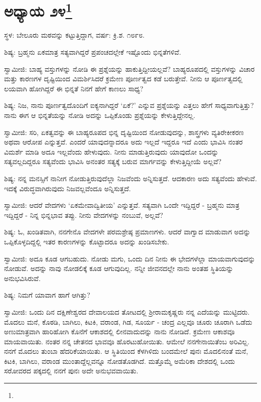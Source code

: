 \chapter[ಅಧ್ಯಾಯ ೨೪]{ಅಧ್ಯಾಯ ೨೪\protect\footnote{}}

\centerline{ಸ್ಥಳ: ಬೇಲೂರು ಮಠವನ್ನು ಕಟ್ಟುತ್ತಿದ್ದಾಗ, ವರ್ಷ: ಕ್ರಿ.ಶ. ೧೮೯೮.}

ಶಿಷ್ಯ: ಬ್ರಹ್ಮನು ಏಕಮಾತ್ರ ಸತ್ಯವಾಗಿದ್ದರೆ ಪ್ರಪಂಚದಲ್ಲೇಕೆ ಇಷ್ಟೊಂದು ಭಿನ್ನತೆಗಳಿವೆ.

ಸ್ವಾಮೀಜಿ: ಬಾಹ್ಯ ವಸ್ತುಗಳನ್ನು ನೋಡಿ ಈ ಪ್ರಶ್ನೆಯನ್ನು ಹಾಕುತ್ತಿದ್ದೀಯಲ್ಲವೆ? ಬಾಹ್ಯರೂಪದಲ್ಲಿ ವಸ್ತುಗಳನ್ನು ವಿಚಾರ ಮತ್ತು ಕಾರಣಗಳ ದೃಷ್ಟಿಯಿಂದ ವಿಮರ್ಶಿಸಿದರೆ ಕ್ರಮೇಣ ಪೂರ್ಣತ್ವದ ಕಡೆ ಬರುತ್ತೇವೆ. ನೀನು ಆ ಪೂರ್ಣತ್ವದಲ್ಲಿ ಲಯವಾಗಿ ಹೋಗಿದ್ದರೆ ಈ ಭಿನ್ನತೆ ನಿನಗೆ ಹೇಗೆ ಕಾಣಲು ಸಾಧ್ಯ?

ಶಿಷ್ಯ: ನಿಜ, ನಾನು ಪೂರ್ಣತ್ವದೊಂದಿಗೆ ಐಕ್ಯನಾಗಿದ್ದರೆ ‘ಏಕೆ?’ ಎನ್ನುವ ಪ್ರಶ್ನೆಯನ್ನು ಎತ್ತಲು ಹೇಗೆ ಸಾಧ್ಯವಾಗುತ್ತಿತ್ತು? ನಾನು ಈಗ ಆ ಭಿನ್ನತೆಯನ್ನು ನೋಡಿ ಅದನ್ನು ಒಪ್ಪಿಕೊಂಡು ಪ್ರಶ್ನೆಯನ್ನು ಕೇಳುತ್ತಿದ್ದೇನಲ್ಲ.

ಸ್ವಾಮೀಜಿ: ಸರಿ, ಏಕತ್ವವನ್ನು ಈ ಬಾಹ್ಯರೂಪದ ಭಿನ್ನ ದೃಷ್ಟಿಯಿಂದ ನೋಡುವುದನ್ನು, ಶಾಸ್ತ್ರಗಳು ವ್ಯತಿರೇಕೀಕರಣ ಅಥವಾ ಆರೋಪ ಎನ್ನುತ್ತವೆ. ಎಂದರೆ ಯಾವುದನ್ನಾದರೂ ಅದು ಇಲ್ಲದೆ ಇದ್ದರೂ ಇದೆ ಎಂದು ಭಾವಿಸಿ ನಂತರ ವಿಮರ್ಶೆ ಮಾಡಿ ಅದೂ ಇಲ್ಲವೆಂದು ಹೇಳುವುದು. ನೀನು ಮಾಡುತ್ತಿರುವುದು ಯಾವುದೋ ಒಂದನ್ನು ಸತ್ಯವಲ್ಲದಿದ್ದರೂ ಸತ್ಯವೆಂದು ಭಾವಿಸಿ ಅನಂತರ ಸತ್ಯಕ್ಕೆ ಬರುವ ಮಾರ್ಗವನ್ನು ಕೇಳುತ್ತಿದ್ದೀಯೆ ಅಲ್ಲವೆ?

ಶಿಷ್ಯ: ನನ್ನ ಮನಸ್ಸಿಗೆ ನಾನೀಗ ನೋಡುತ್ತಿರುವುದೆಲ್ಲಾ ನಿಜವೆಂದು ಅನ್ನಿಸುತ್ತದೆ. ಆದಕಾರಣ ಅದು ಸತ್ಯವೆಂದು ಹೇಳುವೆ. ಇದಕ್ಕೆ ವಿರುದ್ಧವಾಗಿರುವುದು ನಿಜವಲ್ಲವೆಂದೂ ಅನ್ನಿಸುತ್ತದೆ.

ಸ್ವಾಮೀಜಿ: ಆದರೆ ವೇದಗಳು ‘ಏಕಮೇವಾದ್ವಿತೀಯ’ ಎನ್ನುತ್ತವೆ. ಸತ್ಯವಾಗಿ ಒಂದೇ ಇದ್ದಿದ್ದರೆ - ಬ್ರಹ್ಮನು ಮಾತ್ರ ಇದ್ದಿದ್ದರೆ - ನಿನ್ನ ಭಿನ್ನಭಾವ ತಪ್ಪು. ನೀನು ವೇದಗಳನ್ನು ನಂಬುವೆ, ಅಲ್ಲವೆ?

ಶಿಷ್ಯ: ಓ, ಖಂಡಿತವಾಗಿ, ನನಗೇನೊ ವೇದಗಳೇ ಪರಮಶ್ರೇಷ್ಠ ಪ್ರಮಾಣಗಳು. ಆದರೆ ವಾಗ್ವಾದ ಮಾಡುವಾಗ ಅದನ್ನು ಒಪ್ಪಿಕೊಳ್ಳದಿದ್ದಲ್ಲಿ ಇತರ ಕಾರಣಗಳನ್ನು ಕೊಟ್ಟಾದರೂ ಅದನ್ನು ಖಂಡಿಸಬೇಕು.

ಸ್ವಾಮೀಜಿ: ಅದೂ ಕೂಡ ಆಗಬಹುದು. ನೋಡು ಮಗು, ಒಂದು ದಿನ ನೀನು ಈ ಭೇದಗಳೆಲ್ಲಾ ಮಾಯವಾಗುವುದನ್ನು ನೋಡುವೆ. ಅದನ್ನು ನಾವು ನೋಡಲಿಕ್ಕೆ ಕೂಡ ಆಗುವುದಿಲ್ಲ. ನನ್ನೀ ಜೀವನದಲ್ಲೇ ನಾನು ಅಂತಹ ಸ್ಥಿತಿಯನ್ನು ಅನುಭವಿಸಿರುವೆ.

ಶಿಷ್ಯ: ನಿಮಗೆ ಯಾವಾಗ ಹಾಗೆ ಆಗಿತ್ತು?

ಸ್ವಾಮೀಜಿ: ಒಂದು ದಿನ ದಕ್ಷಿಣೇಶ್ವರದ ದೇವಾಲಯದ ತೋಟದಲ್ಲಿ ಶ‍್ರೀರಾಮಕೃಷ್ಣರು ನನ್ನ ಎದೆಯನ್ನು ಮುಟ್ಟಿದರು. ಮೊದಲು ಮನೆ, ಕೊಠಡಿ, ಬಾಗಿಲು, ಕಿಟಕಿ, ವರಾಂಡ, ಗಿಡ, ಸೂರ್ಯ - ಚಂದ್ರ ಎಲ್ಲವೂ ಚೂರು ಚೂರಾಗಿ ಒಡೆದು ಅಣುಮಾತ್ರವಾಗಿ ಹಾರಿಹೋಗಿ ಕೊನೆಗೆ ಆಕಾಶದಲ್ಲಿ ಲೀನವಾದುದನ್ನು ನಾನು ನೋಡಿದೆ. ಕ್ರಮೇಣ ಆಕಾಶವೂ ಮಾಯವಾಯಿತು. ನಂತರ ನನ್ನ ಚೇತನದ ಭಾವವೂ ಹೊರಟುಹೋಯಿತು. ಆಮೇಲೆ ನನಗೇನಾಯಿತೆಂಬ ಅರಿವಿಲ್ಲ. ನನಗೆ ಮೊದಲು ತುಂಬಾ ಹೆದರಿಕೆಯಾಯಿತು. ಆ ಸ್ಥಿತಿಯಿಂದ ಕೆಳಗಿಳಿದು ಬಂದಮೇಲೆ ಪುನಃ ಮೊದಲಿನಂತೆ ಮನೆ, ಕಿಟಕಿ, ಬಾಗಿಲು, ವರಾಂಡ ಮುಂತಾದ್ದೆಲ್ಲವನ್ನೂ ನೋಡತೊಡಗಿದೆ. ಮತ್ತೊಮ್ಮೆ ಅಮೆರಿಕಾ ದೇಶದಲ್ಲಿ ಒಂದು ಸರೋವರದ ಪಕ್ಕದಲ್ಲಿ ನನಗೆ ಪುನಃ ಅದೇ ಅನುಭವವಾಯಿತು.

